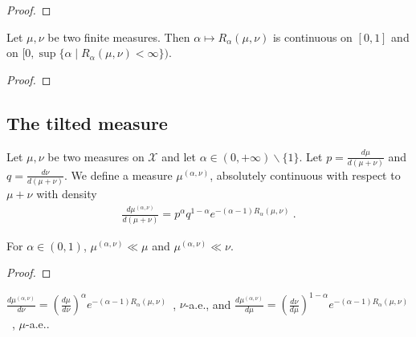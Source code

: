 \begin{proof}
\end{proof}

\begin{lemma}
  \label{lem:renyi_continuous}
  Let $\mu, \nu$ be two finite measures. Then $\alpha \mapsto R_\alpha(\mu, \nu)$ is continuous on $[0, 1]$ and on $[0, \sup \{\alpha \mid R_\alpha(\mu, \nu) < \infty\})$.
\end{lemma}

\begin{proof}
\end{proof}

\subsection{The tilted measure}

\begin{definition}
  \label{def:renyiMeasure}
  \leanok
  Let $\mu, \nu$ be two measures on $\mathcal X$ and let $\alpha \in (0, +\infty) \backslash \{1\}$. Let $p = \frac{d \mu}{d (\mu + \nu)}$ and $q = \frac{d \nu}{d (\mu + \nu)}$. We define a measure $\mu^{(\alpha, \nu)}$, absolutely continuous with respect to $\mu + \nu$ with density
  \begin{align*}
  \frac{d \mu^{(\alpha, \nu)}}{d (\mu + \nu)} = p^\alpha q^{1 - \alpha} e^{-(\alpha - 1)R_\alpha(\mu, \nu)} \: .
  \end{align*}
\end{definition}

\begin{lemma}
  \label{lem:renyiMeasure_ac}
  For $\alpha \in (0,1)$, $\mu^{(\alpha, \nu)} \ll \mu$ and $\mu^{(\alpha, \nu)} \ll \nu$.
\end{lemma}

\begin{proof}%
\uses{}

\end{proof}

\begin{lemma}
  \label{lem:rnDeriv_renyiMeasure}
  $\frac{d \mu^{(\alpha, \nu)}}{d \nu} = \left(\frac{d\mu}{d\nu}\right)^\alpha e^{-(\alpha - 1) R_\alpha(\mu, \nu)}$~, $\nu$-a.e.,
  and
  $\frac{d \mu^{(\alpha, \nu)}}{d \mu} = \left(\frac{d\nu}{d\mu}\right)^{1 - \alpha} e^{-(\alpha - 1) R_\alpha(\mu, \nu)}$~, $\mu$-a.e..
\end{lemma}

